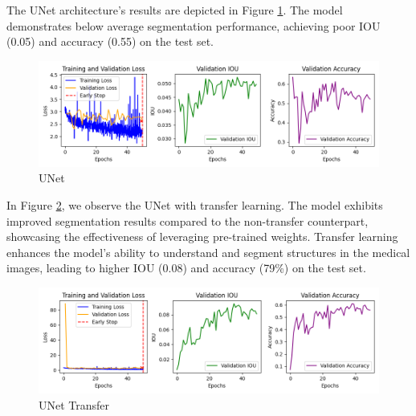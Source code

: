 The UNet architecture's results are depicted in Figure \ref{fig:unet}. The model demonstrates below average segmentation performance, achieving poor IOU (0.05) and accuracy (0.55) on the test set.

\begin{figure}[H]
	\centering
	\includegraphics[width=\textwidth]{plots/unet}
	\caption{UNet}
	\label{fig:unet}
\end{figure}

In Figure \ref{fig:unet_transfer}, we observe the UNet with transfer learning. The model exhibits improved segmentation results compared to the non-transfer counterpart, showcasing the effectiveness of leveraging pre-trained weights. Transfer learning enhances the model's ability to understand and segment structures in the medical images, leading to higher IOU (0.08) and accuracy (79\%) on the test set.

\begin{figure}[H]
	\centering
	\includegraphics[width=\textwidth]{plots/unet_transfer}
	\caption{UNet Transfer}
	\label{fig:unet_transfer}
\end{figure}
